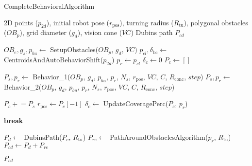 \begin{algorithm}[H]
    \caption{CompleteBehavioralAlgorithm}
    \label{alg:complete_behavioral_obstacle_avoidance}
    \begin{algorithmic}[1]
    \Require 2D points ($p_{2d}$), initial robot pose ($r_{\text{pos}}$), turning radius ($R_{\text{tu}}$), polygonal obstacles ($OB_p$), grid diameter ($g_d$), vision cone ($VC$) 
    \Ensure Dubins path $P_{cd}$

    \State $OB_e, g_s, p_{bu} \leftarrow$ SetupObstacles($OB_p$, $g_d$, $VC$)
    \State $p_{cl}, \delta_{\text{bc}} \leftarrow$ CentroidsAndAutoBehaviorShift($p_{2d}$)
    \State $p_r \leftarrow p_{cl}$
    \State $\delta_c \leftarrow 0$
    \State $P_c \leftarrow []$
    
            \State $P_s, p_r \leftarrow$ Behavior\_1($OB_p$, $g_d$, $p_{bu}$, $p_r$, $N_s$, $r_{\text{pos}}$, $VC$, $C$, $R_{\text{conc}}$, $step$)
        \Else
            \State $P_s, p_r \leftarrow$ Behavior\_2($OB_p$, $g_d$, $p_{bu}$, $p_r$, $N_s$, $r_{\text{pos}}$, $VC$, $C$, $R_{\text{conc}}$, $step$)
        \EndIf
        
        \State $P_c \mathrel{+}= P_s$
        \State $r_{\text{pos}} \leftarrow P_c[-1]$
        \State $\delta_c \leftarrow$ UpdateCoveragePerc($P_c$, $p_r$)
        
            \State \textbf{break}
        \EndIf
    \EndWhile
    
    \State $P_d \leftarrow$ DubinsPath($P_c$, $R_{\text{tu}}$)
    \State $P_{re} \leftarrow$ PathAroundObstaclesAlgorithm($p_r$, $R_{\text{tu}}$)
    \State $P_{cd} \leftarrow P_d + P_{re}$

    \State \Return $P_{cd}$
    \end{algorithmic}
\end{algorithm}


    
